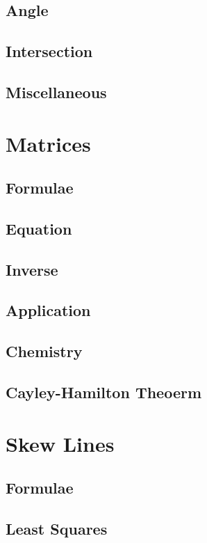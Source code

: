 \documentclass[journal]{IEEEtran}
\begin{document}
\subsection{Angle}

\subsection{Intersection}

\subsection{Miscellaneous }

\newpage
\section{Matrices}
\subsection{Formulae}

\subsection{Equation}

\subsection{Inverse}

\subsection{Application}

\subsection{Chemistry}

\subsection{Cayley-Hamilton Theoerm}

\newpage
\section{Skew Lines}
\subsection{Formulae}

\subsection{Least Squares}

\end{document}
